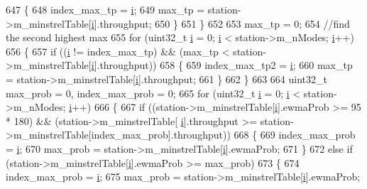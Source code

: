 \begin{DoxyCode}
{647         \{
648           index\_max\_tp = \hyperlink{bernuolliDistribution_8m_a6f6ccfcf58b31cb6412107d9d5281426}{i};
649           max\_tp = station->m\_minstrelTable[\hyperlink{bernuolliDistribution_8m_a6f6ccfcf58b31cb6412107d9d5281426}{i}].throughput;
650         \}
651     \}
652 
653   max\_tp = 0;
654   \textcolor{comment}{//find the second highest max}
655   \textcolor{keywordflow}{for} (uint32\_t \hyperlink{bernuolliDistribution_8m_a6f6ccfcf58b31cb6412107d9d5281426}{i} = 0; \hyperlink{bernuolliDistribution_8m_a6f6ccfcf58b31cb6412107d9d5281426}{i} < station->m\_nModes; \hyperlink{bernuolliDistribution_8m_a6f6ccfcf58b31cb6412107d9d5281426}{i}++)
656     \{
657       \textcolor{keywordflow}{if} ((\hyperlink{bernuolliDistribution_8m_a6f6ccfcf58b31cb6412107d9d5281426}{i} != index\_max\_tp) && (max\_tp < station->m\_minstrelTable[\hyperlink{bernuolliDistribution_8m_a6f6ccfcf58b31cb6412107d9d5281426}{i}].throughput))
658         \{
659           index\_max\_tp2 = \hyperlink{bernuolliDistribution_8m_a6f6ccfcf58b31cb6412107d9d5281426}{i};
660           max\_tp = station->m\_minstrelTable[\hyperlink{bernuolliDistribution_8m_a6f6ccfcf58b31cb6412107d9d5281426}{i}].throughput;
661         \}
662     \}
663 
664   uint32\_t max\_prob = 0, index\_max\_prob = 0;
665   \textcolor{keywordflow}{for} (uint32\_t \hyperlink{bernuolliDistribution_8m_a6f6ccfcf58b31cb6412107d9d5281426}{i} = 0; \hyperlink{bernuolliDistribution_8m_a6f6ccfcf58b31cb6412107d9d5281426}{i} < station->m\_nModes; \hyperlink{bernuolliDistribution_8m_a6f6ccfcf58b31cb6412107d9d5281426}{i}++)
666     \{
667       \textcolor{keywordflow}{if} ((station->m\_minstrelTable[\hyperlink{bernuolliDistribution_8m_a6f6ccfcf58b31cb6412107d9d5281426}{i}].ewmaProb >= 95 * 180) && (station->m\_minstrelTable[
      \hyperlink{bernuolliDistribution_8m_a6f6ccfcf58b31cb6412107d9d5281426}{i}].throughput >= station->m\_minstrelTable[index\_max\_prob].throughput))
668         \{
669           index\_max\_prob = \hyperlink{bernuolliDistribution_8m_a6f6ccfcf58b31cb6412107d9d5281426}{i};
670           max\_prob = station->m\_minstrelTable[\hyperlink{bernuolliDistribution_8m_a6f6ccfcf58b31cb6412107d9d5281426}{i}].ewmaProb;
671         \}
672       \textcolor{keywordflow}{else} \textcolor{keywordflow}{if} (station->m\_minstrelTable[\hyperlink{bernuolliDistribution_8m_a6f6ccfcf58b31cb6412107d9d5281426}{i}].ewmaProb >= max\_prob)
673         \{
674           index\_max\_prob = \hyperlink{bernuolliDistribution_8m_a6f6ccfcf58b31cb6412107d9d5281426}{i};
675           max\_prob = station->m\_minstrelTable[\hyperlink{bernuolliDistribution_8m_a6f6ccfcf58b31cb6412107d9d5281426}{i}].ewmaProb;
}
\end{DoxyCode}
